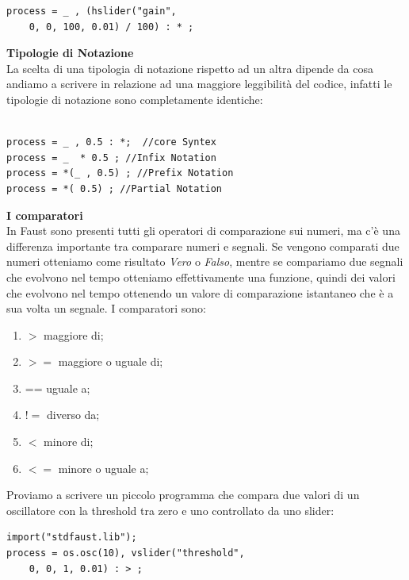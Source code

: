\documentclass[11pt]{article}
\begin{document}
\begin{multicols*}{2}
\begin{Verbatim}[fontsize=\scriptsize]
process = _ , (hslider("gain", 
	0, 0, 100, 0.01) / 100) : * ;

\end{Verbatim}

\textbf{Tipologie di Notazione}\\

La scelta di una tipologia di notazione rispetto ad un altra dipende da cosa andiamo a scrivere in relazione ad una maggiore leggibilità del codice, infatti le tipologie di notazione sono completamente identiche:

\begin{Verbatim}[fontsize=\scriptsize]

process = _ , 0.5 : *;  //core Syntex
process = _  * 0.5 ; //Infix Notation
process = *(_ , 0.5) ; //Prefix Notation
process = *( 0.5) ; //Partial Notation

\end{Verbatim}

\textbf{I comparatori}\\

In Faust sono presenti tutti gli operatori di comparazione sui numeri, ma c'è una differenza importante tra comparare numeri e segnali. Se vengono comparati due numeri otteniamo come risultato \textit{Vero} o \textit{Falso}, mentre se compariamo due segnali che evolvono nel tempo otteniamo effettivamente una funzione, quindi dei valori che evolvono nel tempo ottenendo un valore di comparazione istantaneo che è a sua volta un segnale. I comparatori sono:

\begin{enumerate}
\scriptsize
\item $>$ maggiore di; 
\item $>=$ maggiore o uguale di; 
\item == uguale a; 
\item $!=$ diverso da; 
\item $<$  minore di; 
\item $<=$ minore o uguale a;
\end{enumerate}

Proviamo a scrivere un piccolo programma che compara due valori di un oscillatore con la threshold tra zero e uno controllato da uno slider:

\begin{Verbatim}[fontsize=\scriptsize]
import("stdfaust.lib");
process = os.osc(10), vslider("threshold",
	0, 0, 1, 0.01) : > ;

\end{Verbatim}


\end{multicols*}
\end{document}
